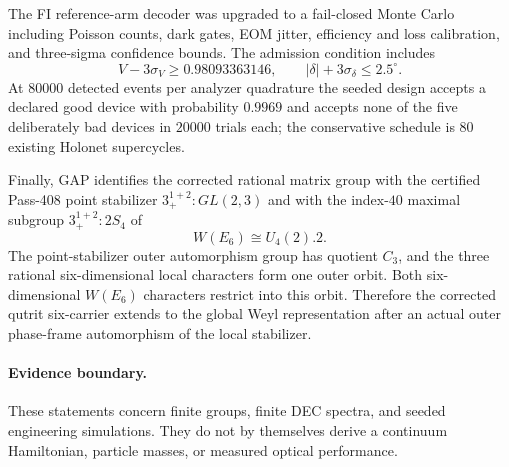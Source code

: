 The FI reference-arm decoder was upgraded to a fail-closed Monte Carlo including
Poisson counts, dark gates, EOM jitter, efficiency and loss calibration, and
three-sigma confidence bounds.  The admission condition includes
\[
V-3\sigma_V\ge0.98093363146,
\qquad
|\delta|+3\sigma_\delta\le2.5^\circ.
\]
At $80000$ detected events per analyzer quadrature the seeded design accepts a
declared good device with probability $0.9969$ and accepts none of the five
deliberately bad devices in $20000$ trials each; the conservative schedule is
$80$ existing Holonet supercycles.

Finally, GAP identifies the corrected rational matrix group with the certified
Pass-408 point stabilizer $3_+^{1+2}:GL(2,3)$ and with the index-$40$ maximal
subgroup $3_+^{1+2}:2S_4$ of
\[
W(E_6)\cong U_4(2).2.
\]
The point-stabilizer outer automorphism group has quotient $C_3$, and the three
rational six-dimensional local characters form one outer orbit.  Both
six-dimensional $W(E_6)$ characters restrict into this orbit.  Therefore the
corrected qutrit six-carrier extends to the global Weyl representation after an
actual outer phase-frame automorphism of the local stabilizer.

\paragraph{Evidence boundary.}
These statements concern finite groups, finite DEC spectra, and seeded
engineering simulations.  They do not by themselves derive a continuum
Hamiltonian, particle masses, or measured optical performance.

